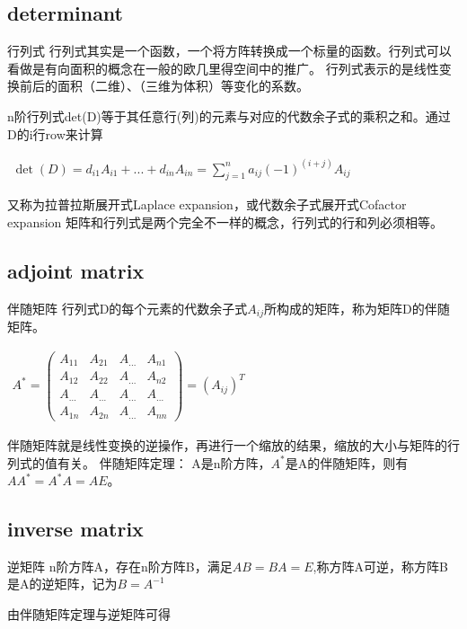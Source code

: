 \subsection{determinant}
行列式
行列式其实是一个函数，一个将方阵转换成一个标量的函数。行列式可以看做是有向面积的概念在一般的欧几里得空间中的推广。
行列式表示的是线性变换前后的面积（二维）、（三维为体积）等变化的系数。

n阶行列式det(D)等于其任意行(列)的元素与对应的代数余子式的乘积之和。通过D的i行row来计算

\begin{math}
    \begin{aligned}
   \det(D)=d_{i1}A_{i1}+...+d_{in}A_{in}=\sum_{j=1}^{n}{a_{ij}(-1)^{(i+j)}A_{ij}}
    \end{aligned}
\end{math}

又称为拉普拉斯展开式Laplace expansion，或代数余子式展开式Cofactor expansion
矩阵和行列式是两个完全不一样的概念，行列式的行和列必须相等。

\subsection{adjoint matrix}
伴随矩阵
行列式D的每个元素的代数余子式$A_{ij}$所构成的矩阵，称为矩阵D的伴随矩阵。

\begin{math}
    \begin{aligned}
A^{*}= \begin{pmatrix} A_{11}&A_{21}&A_{...}&A_{n1} \\
A_{12}&A_{22}&A_{...}&A_{n2} \\
A_{...}&A_{...}&A_{...}&A_{...} \\
A_{1n}&A_{2n}&A_{...}&A_{nn} \end{pmatrix} = (A_{ij})^T
\end{aligned}
\end{math}

伴随矩阵就是线性变换的逆操作，再进行一个缩放的结果，缩放的大小与矩阵的行列式的值有关。
伴随矩阵定理：
A是n阶方阵，$A^*$是A的伴随矩阵，则有$AA^*=A^*A=AE$。

\subsection{inverse matrix}
逆矩阵
n阶方阵A，存在n阶方阵B，满足$AB=BA=E$,称方阵A可逆，称方阵B是A的逆矩阵，记为$B=A^{-1}$

由伴随矩阵定理与逆矩阵可得


